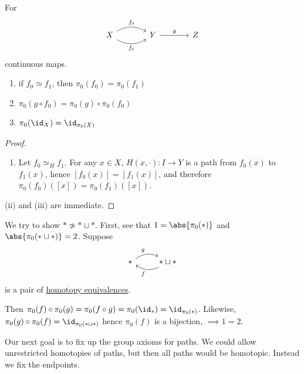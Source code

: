 \documentclass{article}
\numberwithin{nthm}{subsection}
\begin{document}
\begin{prop}
    For
    \begin{equation*}
        \begin{tikzcd}[column sep=large]
            X \rar[bend left,"f_0"] \rar[bend right,"f_1"'] & Y \rar["g"] & Z
        \end{tikzcd}
    \end{equation*}
    continuous maps.
    \begin{enumerate}[label=(\roman*)]
        \item if $f_0 \simeq f_1$, then $\pi_0(f_0) = \pi_0(f_1)$
        \item $\pi_0(g \circ f_0) = \pi_0(g) \circ \pi_0(f_0)$
        \item $\pi_0(\id_X) = \id_{\pi_0(X)}$
    \end{enumerate}
\end{prop}

\begin{proof}
    \leavevmode
    \begin{enumerate}[label=(\roman*)]
        \item Let $f_0 \simeq_H f_1$.
            For any $x \in X$, $H(x, \cdot): I \to Y$ is a path from $f_0(x)$ to $f_1(x)$, hence $[f_0(x)] = [f_1(x)]$, and therefore $\pi_0(f_0)([x]) = \pi_0(f_1)([x])$.
    \end{enumerate}
    (ii) and (iii) are immediate.
\end{proof}

\begin{eg}
    We try to show $* \not \simeq * \sqcup *$.
    First, see that $1 = \abs{\pi_0(*)}$ and $\abs{\pi_0(* \sqcup *)} = 2$.
    Suppose
    \begin{equation*}
        \begin{tikzcd}
            \ast \rar[bend left, "g"] & \ast \sqcup \ast \lar[bend left, "f"]
        \end{tikzcd}
    \end{equation*}
    is a pair of \hyperlink{def:homotopyEq}{homotopy equivalences}.

    Then $\pi_0(f) \circ \pi_0(g) = \pi_0(f \circ g) = \pi_0(\id_*) = \id_{\pi_0(*)}$. Likewise, $\pi_0(g) \circ \pi_0(f) = \id_{\pi_0(* \sqcup *)}$ hence $\pi_0(f)$ is a bijection, $\implies 1=2$.
\end{eg}

Our next goal is to fix up the group axioms for paths. We could allow unrestricted homotopies of paths, but then all paths would be homotopic. Instead we fix the endpoints.
\end{document}
